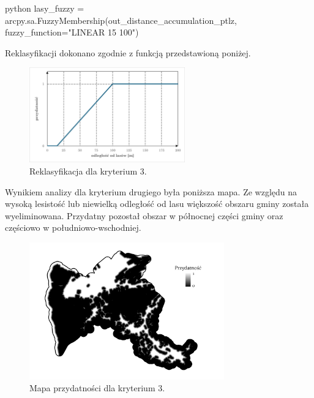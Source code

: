 \documentclass{article}
\begin{document}
\begin{mintedbox}{python}
lasy_fuzzy = arcpy.sa.FuzzyMembership(out_distance_accumulation_ptlz, fuzzy_function="LINEAR 15 100")
\end{mintedbox}
\vspace{10pt}

Reklasyfikacji dokonano zgodnie z funkcją przedstawioną poniżej.
\vspace{5pt}

\begin{figure}[H]
    \centering
    \includegraphics[width=0.6\textwidth]{img/kryterium3-wykres-glowny.png}
    \caption*{Reklasyfikacja dla kryterium 3.}
\end{figure}
\vspace{10pt}

Wynikiem analizy dla kryterium drugiego była poniższa mapa. Ze względu na wysoką lesistość lub niewielką odległość od lasu większość obszaru gminy została wyeliminowana. Przydatny pozostał obszar w północnej części gminy oraz częściowo w południowo-wschodniej.
\vspace{5pt}

\begin{figure}[H]
    \centering
    \includegraphics[width=0.75\textwidth]{img/kryterium3-layout.jpg}
    \caption{Mapa przydatności dla kryterium 3.}
\end{figure}
\vspace{10pt}
\end{document}
